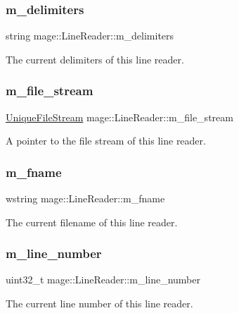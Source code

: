 \subsubsection{\texorpdfstring{m\+\_\+delimiters}{m\_delimiters}}
{\footnotesize\ttfamily string mage\+::\+Line\+Reader\+::m\+\_\+delimiters\hspace{0.3cm}{\ttfamily [private]}}

The current delimiters of this line reader. \hypertarget{classmage_1_1_line_reader_a510ff5355c6d26d7c29dc692ef18a3e2}{}\label{classmage_1_1_line_reader_a510ff5355c6d26d7c29dc692ef18a3e2} 
\subsubsection{\texorpdfstring{m\+\_\+file\+\_\+stream}{m\_file\_stream}}
{\footnotesize\ttfamily \hyperlink{namespacemage_a4250d57cb76846bd81137e496ca41148}{Unique\+File\+Stream} mage\+::\+Line\+Reader\+::m\+\_\+file\+\_\+stream\hspace{0.3cm}{\ttfamily [private]}}

A pointer to the file stream of this line reader. \hypertarget{classmage_1_1_line_reader_ad6f55ba12fc610ab2fc1c26a48d12321}{}\label{classmage_1_1_line_reader_ad6f55ba12fc610ab2fc1c26a48d12321} 
\subsubsection{\texorpdfstring{m\+\_\+fname}{m\_fname}}
{\footnotesize\ttfamily wstring mage\+::\+Line\+Reader\+::m\+\_\+fname\hspace{0.3cm}{\ttfamily [private]}}

The current filename of this line reader. \hypertarget{classmage_1_1_line_reader_ada0b4ec5817b96c6b1bb43bd2573f8ba}{}\label{classmage_1_1_line_reader_ada0b4ec5817b96c6b1bb43bd2573f8ba} 
\subsubsection{\texorpdfstring{m\+\_\+line\+\_\+number}{m\_line\_number}}
{\footnotesize\ttfamily uint32\+\_\+t mage\+::\+Line\+Reader\+::m\+\_\+line\+\_\+number\hspace{0.3cm}{\ttfamily [private]}}

The current line number of this line reader. 